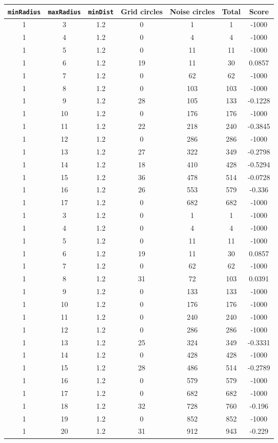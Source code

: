 \documentclass[letterpaper, 12pt]{article}
\begin{document}
\begin{longtable}{|c|c|c|c|c|c|c|}
\hline
\textbf{\texttt{minRadius}} & \textbf{\texttt{maxRadius}} & \textbf{\texttt{minDist}} & \textbf{Grid circles} & \textbf{Noise circles} & \textbf{Total} & \textbf{Score} \\
\hline
1 & 3 & 1.2 & 0 & 1 & 1 & -1000 \\
\hline
1 & 4 & 1.2 & 0 & 4 & 4 & -1000 \\
\hline
1 & 5 & 1.2 & 0 & 11 & 11 & -1000 \\
\hline
1 & 6 & 1.2 & 19 & 11 & 30 & 0.0857 \\
\hline
1 & 7 & 1.2 & 0 & 62 & 62 & -1000 \\
\hline
1 & 8 & 1.2 & 0 & 103 & 103 & -1000 \\
\hline
1 & 9 & 1.2 & 28 & 105 & 133 & -0.1228 \\
\hline
1 & 10 & 1.2 & 0 & 176 & 176 & -1000 \\
\hline
1 & 11 & 1.2 & 22 & 218 & 240 & -0.3845 \\
\hline
1 & 12 & 1.2 & 0 & 286 & 286 & -1000 \\
\hline
1 & 13 & 1.2 & 27 & 322 & 349 & -0.2798 \\
\hline
1 & 14 & 1.2 & 18 & 410 & 428 & -0.5294 \\
\hline
1 & 15 & 1.2 & 36 & 478 & 514 & -0.0728 \\
\hline
1 & 16 & 1.2 & 26 & 553 & 579 & -0.336 \\
\hline
1 & 17 & 1.2 & 0 & 682 & 682 & -1000 \\
\hline
1 & 3 & 1.2 & 0 & 1 & 1 & -1000 \\
\hline
1 & 4 & 1.2 & 0 & 4 & 4 & -1000 \\
\hline
1 & 5 & 1.2 & 0 & 11 & 11 & -1000 \\
\hline
1 & 6 & 1.2 & 19 & 11 & 30 & 0.0857 \\
\hline
1 & 7 & 1.2 & 0 & 62 & 62 & -1000 \\
\hline
1 & 8 & 1.2 & 31 & 72 & 103 & 0.0391 \\
\hline
1 & 9 & 1.2 & 0 & 133 & 133 & -1000 \\
\hline
1 & 10 & 1.2 & 0 & 176 & 176 & -1000 \\
\hline
1 & 11 & 1.2 & 0 & 240 & 240 & -1000 \\
\hline
1 & 12 & 1.2 & 0 & 286 & 286 & -1000 \\
\hline
1 & 13 & 1.2 & 25 & 324 & 349 & -0.3331 \\
\hline
1 & 14 & 1.2 & 0 & 428 & 428 & -1000 \\
\hline
1 & 15 & 1.2 & 28 & 486 & 514 & -0.2789 \\
\hline
1 & 16 & 1.2 & 0 & 579 & 579 & -1000 \\
\hline
1 & 17 & 1.2 & 0 & 682 & 682 & -1000 \\
\hline
1 & 18 & 1.2 & 32 & 728 & 760 & -0.196 \\
\hline
1 & 19 & 1.2 & 0 & 852 & 852 & -1000 \\
\hline
1 & 20 & 1.2 & 31 & 912 & 943 & -0.229 \\
\hline
\end{longtable}
\end{document}
